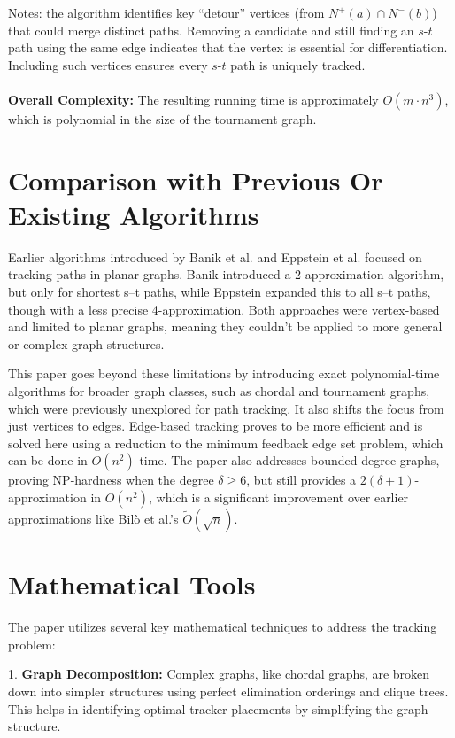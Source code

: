 \documentclass{article}
\begin{document}
Notes: the algorithm identifies key ``detour'' vertices (from \( N^+(a) \cap N^-(b) \)) that could merge distinct paths. Removing a candidate and still finding an \( s \)-\( t \) path using the same edge indicates that the vertex is essential for differentiation. Including such vertices ensures every \( s \)-\( t \) path is uniquely tracked.
\\ \\
\textbf{Overall Complexity:} The resulting running time is approximately \( O(m \cdot n^3) \), which is polynomial in the size of the tournament graph.

\section*{Comparison with Previous Or Existing Algorithms}

Earlier algorithms introduced by Banik et al. and Eppstein et al. focused on tracking paths in planar graphs. Banik introduced a 2-approximation algorithm, but only for shortest s–t paths, while Eppstein expanded this to all s–t paths, though with a less precise 4-approximation. Both approaches were vertex-based and limited to planar graphs, meaning they couldn’t be applied to more general or complex graph structures.

This paper goes beyond these limitations by introducing exact polynomial-time algorithms for broader graph classes, such as chordal and tournament graphs, which were previously unexplored for path tracking. It also shifts the focus from just vertices to edges. Edge-based tracking proves to be more efficient and is solved here using a reduction to the minimum feedback edge set problem, which can be done in $O(n^2)$ time. The paper also addresses bounded-degree graphs, proving NP-hardness when the degree $\delta \geq 6$, but still provides a $2(\delta + 1)$-approximation in $O(n^2)$, which is a significant improvement over earlier approximations like Bilò et al.'s $\widetilde{O}(\sqrt{n})$. 

\section*{Mathematical Tools}

The paper utilizes several key mathematical techniques to address the tracking problem:

1. \textbf{Graph Decomposition:} Complex graphs, like chordal graphs, are broken down into simpler structures using perfect elimination orderings and clique trees. This helps in identifying optimal tracker placements by simplifying the graph structure.
\end{document}
